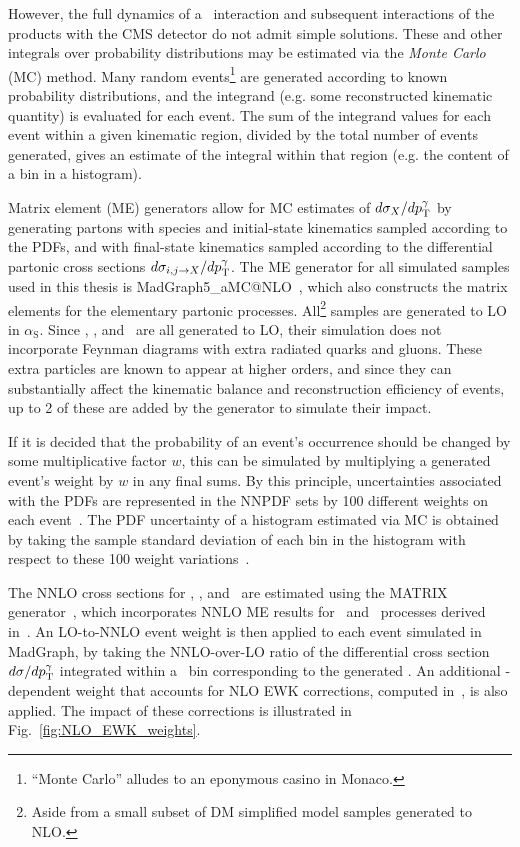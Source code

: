 However, the full dynamics of a \Pp\Pp\ interaction and subsequent interactions of the products with the CMS detector do not admit simple solutions.
These and other integrals over probability distributions may be estimated
via the \textit{Monte Carlo} (MC) method. Many random events\footnote{``Monte Carlo'' alludes to an eponymous casino in Monaco.}
are generated according to known probability distributions,
and the integrand (e.g. some reconstructed kinematic quantity) is evaluated for each event.
The sum of the integrand values for each event within a given kinematic region,
divided by the total number of events generated, gives an estimate of the integral within that region (e.g. the
content of a bin in a histogram).

Matrix element (ME) generators allow for MC estimates of $d\sigma_{X}/dp^{\gamma}_\mathrm{T}$ by generating
partons with species and initial-state kinematics sampled according to the PDFs, and with final-state kinematics sampled
according to the differential partonic cross sections $d\sigma_{i,j \to X}/dp^{\gamma}_\mathrm{T}$.
The ME generator for all simulated samples used in this thesis is MadGraph5\_aMC@NLO~\cite{ref:JHEP07(2014)079},
which also constructs the matrix elements for the elementary partonic processes.
All\footnote{Aside from a small subset of DM simplified model samples generated to NLO.} samples are generated to LO in $\alpha_\mathrm{S}$.
Since \zinvg, \wlng, and \zllg\ are all generated to LO, their simulation does
not incorporate Feynman diagrams with extra radiated quarks and gluons. These extra particles are known
to appear at higher orders, and since they can substantially affect the kinematic balance and reconstruction
efficiency of events, up to 2 of these are added by the generator to simulate their impact.

If it is decided that the probability of an event's occurrence should be changed by some multiplicative factor $w$, this can be simulated
by multiplying a generated event's weight by $w$ in any final sums. By this principle, uncertainties associated with the PDFs are
represented in the NNPDF sets by 100 different weights on each event~\cite{ref:NNPDF30,ref:NNPDF31}. The PDF uncertainty of a histogram
estimated via MC is obtained by taking the sample standard deviation of each bin in the histogram with respect to these 100 weight variations~\cite{ref:0954-3899/43/2/023001}.

The NNLO cross sections for \zinvg, \wlng, and \zllg\ are estimated using the MATRIX generator~\cite{ref:epjc/s10052-018-5771-7},
which incorporates NNLO ME results for \PZ\Pgamma\ and \PW\Pgamma\ processes derived in~\cite{ref:j.physletb.2014.02.037, ref:JHEP07(2015)085, ref:JHEP12(2015)047}.
An LO-to-NNLO event weight is then applied to each event simulated in MadGraph, by taking the NNLO-over-LO ratio of the differential cross section $d\sigma/dp^{\gamma}_\mathrm{T}$
integrated within a \pTgamma\ bin corresponding to the generated \Pgamma.
An additional \pTgamma-dependent weight that accounts for NLO EWK corrections, computed in~\cite{ref:JHEP04(2015)018, ref:JHEP02(2016)057}, is also applied.
The impact of these corrections is illustrated in Fig.~\ref{fig:NLO_EWK_weights}.


